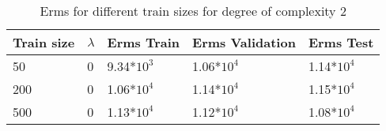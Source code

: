\def\arraystretch{1.25}
\begin{table}[H]
\centering
\begin{tabular}{l l l l l}
\hline
\hline
\textbf{Train size} & \textbf{$\lambda$} & \textbf{Erms Train} & \textbf{Erms Validation} & \textbf{Erms Test}\\
\hline
\hline
50 & 0 & 9.34*$10^3$ & 1.06*$10^4$ & 1.14*$10^4$  \\
200 & 0 & 1.06*$10^4$ & 1.14*$10^4$ & 1.15*$ 10^4$  \\
500 & 0 & 1.13*$10^4$ & 1.12*$10^4$ & 1.08*$10^4$\\
\hline
\end{tabular}
\caption{Erms for different train sizes for degree of complexity 2}
\end{table}
